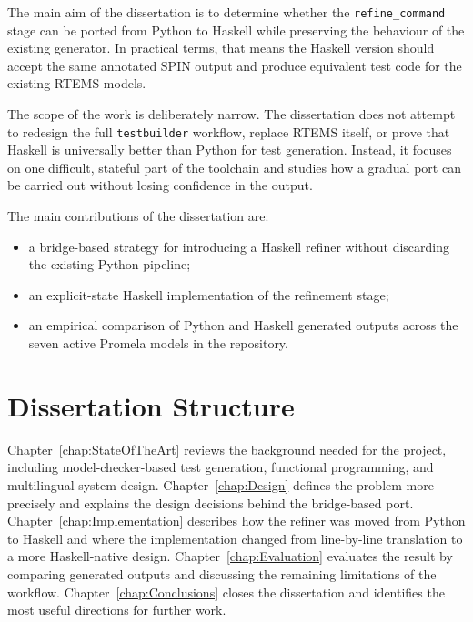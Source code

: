 The main aim of the dissertation is to determine whether the \texttt{refine\_command} stage can be ported from Python to Haskell while preserving the behaviour of the existing generator. In practical terms, that means the Haskell version should accept the same annotated SPIN output and produce equivalent test code for the existing RTEMS models.

The scope of the work is deliberately narrow. The dissertation does not attempt to redesign the full \texttt{testbuilder} workflow, replace RTEMS itself, or prove that Haskell is universally better than Python for test generation. Instead, it focuses on one difficult, stateful part of the toolchain and studies how a gradual port can be carried out without losing confidence in the output.

The main contributions of the dissertation are:
\begin{itemize}
  \item a bridge-based strategy for introducing a Haskell refiner without discarding the existing Python pipeline;
  \item an explicit-state Haskell implementation of the refinement stage;
  \item an empirical comparison of Python and Haskell generated outputs across the seven active Promela models in the repository.
\end{itemize}

\section{Dissertation Structure}


Chapter~\ref{chap:StateOfTheArt} reviews the background needed for the project, including model-checker-based test generation, functional programming, and multilingual system design. Chapter~\ref{chap:Design} defines the problem more precisely and explains the design decisions behind the bridge-based port. Chapter~\ref{chap:Implementation} describes how the refiner was moved from Python to Haskell and where the implementation changed from line-by-line translation to a more Haskell-native design. Chapter~\ref{chap:Evaluation} evaluates the result by comparing generated outputs and discussing the remaining limitations of the workflow. Chapter~\ref{chap:Conclusions} closes the dissertation and identifies the most useful directions for further work.

